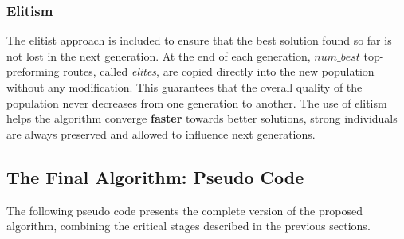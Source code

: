 \documentclass{scrartcl}
\begin{document}


\subsubsection{Elitism}
The elitist approach is included to ensure that the best solution found so far is not lost in the next generation. At the end of each generation, $num\_best$ top-preforming routes, called \textit{elites}, are copied directly into the new population without any modification. This guarantees that the overall quality of the population never decreases from one generation to another. The use of elitism helps the algorithm converge \textbf{faster} towards better solutions, strong individuals are always preserved and allowed to influence next generations.

\subsection{The Final Algorithm: Pseudo Code}

The following pseudo code presents the complete version of the proposed algorithm, combining the critical stages described in the previous sections.
\end{document}

